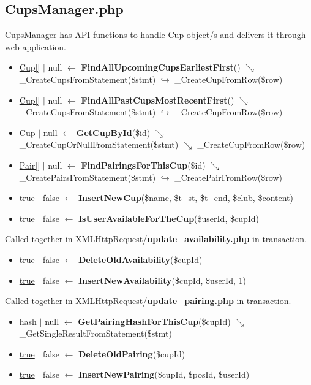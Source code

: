 \subsection{CupsManager.php}
CupsManager has API functions to handle Cup object/s and delivers it through web application.
\begin{itemize}
  \setlength\itemsep{0em}
  \item \underline{Cup[]} $\vert$ null $\leftarrow$ \textbf{FindAllUpcomingCupsEarliestFirst}()
  \newline    $\searrow$ \_CreateCupsFromStatement(\$stmt)
  \newline    $\hookrightarrow$ \_CreateCupFromRow(\$row)
  \item \underline{Cup[]} $\vert$ null $\leftarrow$ \textbf{FindAllPastCupsMostRecentFirst}()
  \newline    $\searrow$ \_CreateCupsFromStatement(\$stmt)
  \newline    $\hookrightarrow$ \_CreateCupFromRow(\$row)
  \item \underline{Cup} $\vert$ null  $\leftarrow$  \textbf{GetCupById}(\$id)
  \newline    $\searrow$ \_CreateCupOrNullFromStatement(\$stmt)
  \newline    $\searrow$ \_CreateCupFromRow(\$row)
  \item \underline{Pair[]} $\vert$ null $\leftarrow$  \textbf{FindPairingsForThisCup}(\$id)
  \newline    $\searrow$ \_CreatePairsFromStatement(\$stmt)
  \newline    $\hookrightarrow$ \_CreatePairFromRow(\$row)
  \item \underline{true} $\vert$ false $\leftarrow$  \textbf{InsertNewCup}(\$name, \$t\_st, \$t\_end, \$club, \$content)
  \item \underline{true} $\vert$ \underline{false} $\leftarrow$  \textbf{IsUserAvailableForTheCup}(\$userId, \$cupId)
\end{itemize}
Called together in XMLHttpRequest/\textbf{update\_availability.php} in transaction.  
  \begin{itemize}
  \item \underline{true} $\vert$ false $\leftarrow$ \textbf{DeleteOldAvailability}(\$cupId)
  \item \underline{true} $\vert$ false $\leftarrow$ \textbf{InsertNewAvailability}(\$cupId, \$userId, 1)
\end{itemize}
Called together in XMLHttpRequest/\textbf{update\_pairing.php} in transaction.  
  \begin{itemize}
  \item \underline{hash} $\vert$ null $\leftarrow$ \textbf{GetPairingHashForThisCup}(\$cupId)
  \newline    $\searrow$ \_GetSingleResultFromStatement(\$stmt)
  \item \underline{true} $\vert$ false $\leftarrow$ \textbf{DeleteOldPairing}(\$cupId)
  \item \underline{true} $\vert$ false $\leftarrow$ \textbf{InsertNewPairing}(\$cupId, \$posId, \$userId)
\end{itemize}

